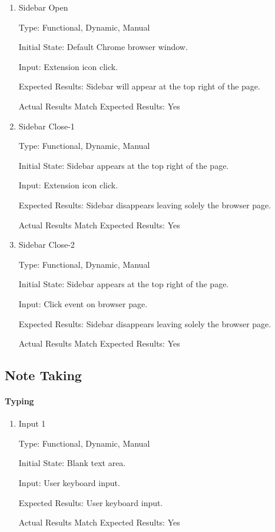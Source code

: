 \documentclass[12pt, titlepage]{article}
\begin{document}
\begin{enumerate}
	
	\item{Sidebar Open\\}
	
	Type: Functional, Dynamic, Manual
	
	Initial State: Default Chrome browser window.
	
	Input: Extension icon click.
	
	Expected Results: Sidebar will appear at the top right of the page.
	
	Actual Results Match Expected Results: Yes
	
	\item{Sidebar Close-1\\}
	
	Type: Functional, Dynamic, Manual
	
	Initial State: Sidebar appears at the top right of the page.
	
	Input: Extension icon click.
	
	Expected Results: Sidebar disappears leaving solely the browser page.
	
	Actual Results Match Expected Results: Yes
	
	\item{Sidebar Close-2\\}
	
	Type: Functional, Dynamic, Manual
	
	Initial State: Sidebar appears at the top right of the page.
	
	Input: Click event on browser page.
	
	Expected Results: Sidebar disappears leaving solely the browser page.
	
	Actual Results Match Expected Results: Yes
	
\end{enumerate}

\subsection{Note Taking}

\paragraph{Typing}

\begin{enumerate}
	
	\item{Input 1\\}
	
	Type: Functional, Dynamic, Manual
	
	Initial State: Blank text area.
	
	Input: User keyboard input.
	
	Expected Results: User keyboard input.
	
	Actual Results Match Expected Results: Yes
	
\end{enumerate}
\end{document}
